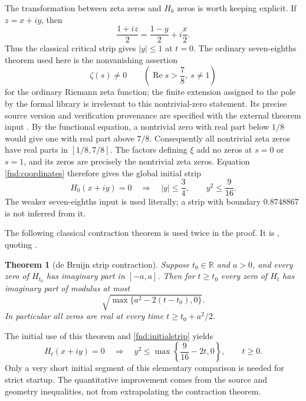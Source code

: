 \documentclass[11pt,a4paper]{article}
\newtheorem{theorem}{Theorem}[section]
\theoremstyle{definition}
\theoremstyle{remark}
\newcommand{\Ree}{\operatorname{Re}}
\begin{document}
The transformation between zeta zeros and $H_0$ zeros is worth keeping
explicit. If $z=x+iy$, then
\begin{equation}
 \frac{1+iz}{2}=\frac{1-y}{2}+i\frac{x}{2}.
 \label{fnd:coordinates}
\end{equation}
Thus the classical critical strip gives $|y|\leq1$ at $t=0$.
The ordinary seven-eighths theorem used here is the nonvanishing assertion
\begin{equation}
 \zeta(s)\ne0\qquad\left(\Ree s>\frac78,\ s\ne1\right)
 \label{fnd:seveneighths}
\end{equation}
for the ordinary Riemann zeta function; the finite extension assigned to
the pole by the formal library is irrelevant to this nontrivial-zero
statement. Its precise source version and verification provenance are
specified with the external theorem input
\cite{OAI:The-Quasi-Riemann-Hypothesis-September-30-2026}. By the functional equation, a nontrivial zero with
real part below $1/8$ would give one with real part above $7/8$.
Consequently all nontrivial zeta zeros have real parts in $[1/8,7/8]$.
The factors defining $\xi$ add no zeros at $s=0$ or $s=1$, and its zeros
are precisely the nontrivial zeta zeros. Equation \eqref{fnd:coordinates}
therefore gives the global initial strip
\begin{equation}
 H_0(x+iy)=0\quad\Longrightarrow\quad |y|\leq\frac34,
 \qquad y^2\leq\frac9{16}.
 \label{fnd:initialstrip}
\end{equation}
The weaker seven-eighths input is used literally; a strip with boundary
$0.8748867$ is not inferred from it.

The following classical contraction theorem is used twice in the proof. It is \cite[Theorem~3.2]{Polymath}, quoting
\cite[Theorem~13]{deBruijn}.
\begin{theorem}[de Bruijn strip contraction]\label{fnd:debruijn}
Suppose $t_0\in\mathbb R$ and $a>0$, and every zero of $H_{t_0}$ has
imaginary part in $[-a,a]$. Then for $t\geq t_0$ every zero of $H_t$ has
imaginary part of modulus at most
\[
 \sqrt{\max\{a^2-2(t-t_0),0\}}.
\]
In particular all zeros are real at every time $t\geq t_0+a^2/2$.
\end{theorem}
The initial use of this theorem and \eqref{fnd:initialstrip} yields
\begin{equation}
 H_t(x+iy)=0\quad\Longrightarrow\quad
 y^2\leq\max\left\{\frac9{16}-2t,0\right\},\qquad t\geq0.
 \label{fnd:initialcontraction}
\end{equation}
Only a very short initial segment of this elementary comparison is needed
for strict startup. The quantitative improvement comes from the source
and geometry inequalities, not from extrapolating the contraction theorem.
\end{document}
